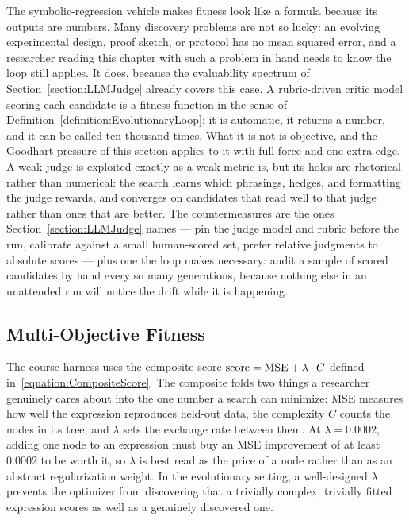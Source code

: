 The symbolic-regression vehicle makes fitness look like a formula because its outputs are numbers.
Many discovery problems are not so lucky: an evolving experimental design, proof sketch, or protocol has no mean squared error, and a researcher reading this chapter with such a problem in hand needs to know the loop still applies.
It does, because the evaluability spectrum of Section~\ref{section:LLMJudge} already covers this case.
A rubric-driven critic model scoring each candidate is a fitness function in the sense of Definition~\ref{definition:EvolutionaryLoop}: it is automatic, it returns a number, and it can be called ten thousand times.
What it is not is objective, and the Goodhart pressure of this section applies to it with full force and one extra edge.
A weak judge is exploited exactly as a weak metric is, but its holes are rhetorical rather than numerical: the search learns which phrasings, hedges, and formatting the judge rewards, and converges on candidates that read well to that judge rather than ones that are better.
The countermeasures are the ones Section~\ref{section:LLMJudge} names --- pin the judge model and rubric before the run, calibrate against a small human-scored set, prefer relative judgments to absolute scores --- plus one the loop makes necessary: audit a sample of scored candidates by hand every so many generations, because nothing else in an unattended run will notice the drift while it is happening.

\subsection{Multi-Objective Fitness}

The course harness uses the composite score $\mathrm{score} = \mathrm{MSE} + \lambda \cdot C$ defined in~\eqref{equation:CompositeScore}.
The composite folds two things a researcher genuinely cares about into the one number a search can minimize: $\mathrm{MSE}$ measures how well the expression reproduces held-out data, the complexity $C$ counts the nodes in its tree, and $\lambda$ sets the exchange rate between them.
At $\lambda = 0.0002$, adding one node to an expression must buy an MSE improvement of at least $0.0002$ to be worth it, so $\lambda$ is best read as the price of a node rather than as an abstract regularization weight.
In the evolutionary setting, a well-designed $\lambda$ prevents the optimizer from discovering that a trivially complex, trivially fitted expression scores as well as a genuinely discovered one.

